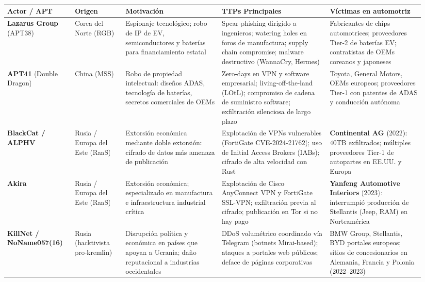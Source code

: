 \documentclass[letterpaper,11pt]{article}
\begin{document}
\vspace{0.2cm}
\begingroup\footnotesize
{}
\begin{tabular}{|p{2.5cm}|p{1.5cm}|p{2.5cm}|p{3.8cm}|p{3.5cm}|}
\hline
\rowcolor{blue!22}
\textbf{Actor / APT} & \textbf{Origen} & \textbf{Motivación} & \textbf{TTPs Principales} & \textbf{Víctimas en automotriz} \\
\hline
\textbf{Lazarus Group} (APT38) \autocite{mitre-lazarus} &
  Corea del Norte (RGB) &
  Espionaje tecnológico; robo de IP de EV, semiconductores y baterías para financiamiento estatal &
  Spear-phishing dirigido a ingenieros; watering holes en foros de manufactura; supply chain compromise; malware destructivo (WannaCry, Hermes) &
  Fabricantes de chips automotrices; proveedores Tier-2 de baterías EV; contratistas de OEMs coreanos y japoneses \\
\hline
\textbf{APT41} (Double Dragon) \autocite{mitre-apt41} &
  China (MSS) &
  Robo de propiedad intelectual: diseños ADAS, tecnología de baterías, secretos comerciales de OEMs &
  Zero-days en VPN y software empresarial; living-off-the-land (LOtL); compromiso de cadena de suministro software; exfiltración silenciosa de largo plazo &
  Toyota, General Motors, OEMs europeos; proveedores Tier-1 con patentes de ADAS y conducción autónoma \\
\hline
\textbf{BlackCat / ALPHV} \autocite{mitre-blackcat} &
  Rusia / Europa del Este (RaaS) &
  Extorsión económica mediante doble extorsión: cifrado de datos más amenaza de publicación &
  Explotación de VPNs vulnerables (FortiGate CVE-2024-21762); uso de Initial Access Brokers (IABs); cifrado de alta velocidad con Rust &
  \textbf{Continental AG} (2022): 40TB exfiltrados; múltiples proveedores Tier-1 de autopartes en EE.UU. y Europa \\
\hline
\textbf{Akira} \autocite{mitre-akira} &
  Rusia / Europa del Este (RaaS) &
  Extorsión económica; especializado en manufactura e infraestructura industrial crítica &
  Explotación de Cisco AnyConnect VPN y FortiGate SSL-VPN; exfiltración previa al cifrado; publicación en Tor si no hay pago &
  \textbf{Yanfeng Automotive Interiors} (2023): interrumpió producción de Stellantis (Jeep, RAM) en Norteamérica \\
\hline
\textbf{KillNet / NoName057(16)} \autocite{mitre-killnet} &
  Rusia (hacktivista pro-kremlin) &
  Disrupción política y económica en países que apoyan a Ucrania; daño reputacional a industrias occidentales &
  DDoS volumétrico coordinado vía Telegram (botnets Mirai-based); ataques a portales web públicos; deface de páginas corporativas &
  BMW Group, Stellantis, BYD portales europeos; sitios de concesionarios en Alemania, Francia y Polonia (2022--2023) \\
\hline
\end{tabular}
\endgroup
\end{document}
